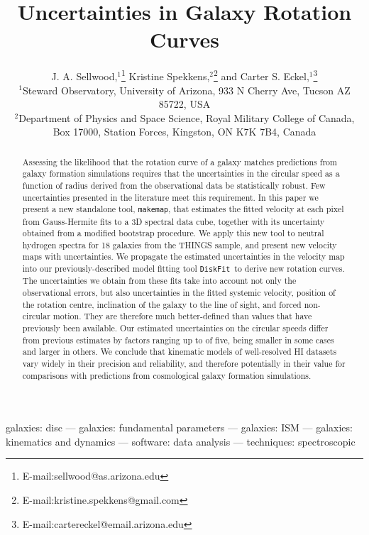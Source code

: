 \documentclass[letterpaper,fleqn,usenatbib]{mnras}
\title[Galaxy Rotation Curves]{Uncertainties in Galaxy Rotation Curves}
\author[Sellwood, Spekkens \& Eckel]{
J. A. Sellwood,$^{1}$\thanks{E-mail:sellwood@as.arizona.edu}
Kristine Spekkens,$^{2}$\thanks{E-mail:kristine.spekkens@gmail.com}
and
Carter S. Eckel,$^1$\thanks{E-mail:cartereckel@email.arizona.edu}
\\
$^1$Steward Observatory, University of Arizona, 933 N Cherry Ave,
Tucson AZ 85722, USA  \\ $^2$Department of Physics and Space Science, Royal Military College of Canada, Box 17000, Station Forces, Kingston, ON K7K 7B4, Canada}
\def\DFt{{\tt DiskFit}}
\def\mkm{{\tt makemap}}
\begin{document}
\label{firstpage}
\pagerange{\pageref{firstpage}--\pageref{lastpage}}
\maketitle

\begin{abstract}
Assessing the likelihood that the rotation curve of a galaxy matches
predictions from galaxy formation simulations requires that the
uncertainties in the circular speed as a function of radius derived
from the observational data be statistically robust.  Few
uncertainties presented in the literature meet this requirement.  In
this paper we present a new standalone tool, \mkm, that estimates the
fitted velocity at each pixel from Gauss-Hermite fits to a 3D spectral
data cube, together with its uncertainty obtained from a modified
bootstrap procedure.  We apply this new tool to neutral hydrogen
spectra for 18 galaxies from the THINGS sample, and present new
velocity maps with uncertainties.  We propagate the estimated
uncertainties in the velocity map into our previously-described model
fitting tool \DFt\ to derive new rotation curves.  The uncertainties
we obtain from these fits take into account not only the observational
errors, but also uncertainties in the fitted systemic velocity,
position of the rotation centre, inclination of the galaxy to the line
of sight, and forced non-circular motion.  They are therefore much
better-defined than values that have previously been available.  Our
estimated uncertainties on the circular speeds differ from previous
estimates by factors ranging up to of five, being smaller in some
cases and larger in others.  We conclude that kinematic models of
well-resolved HI datasets vary widely in their precision and
reliability, and therefore potentially in their value for comparisons
with predictions from cosmological galaxy formation simulations.
\end{abstract}

\begin{keywords}
galaxies: disc ---
galaxies: fundamental parameters ---
galaxies: ISM ---
galaxies: kinematics and dynamics ---
software: data analysis ---
techniques: spectroscopic
\end{keywords}

\end{document}
